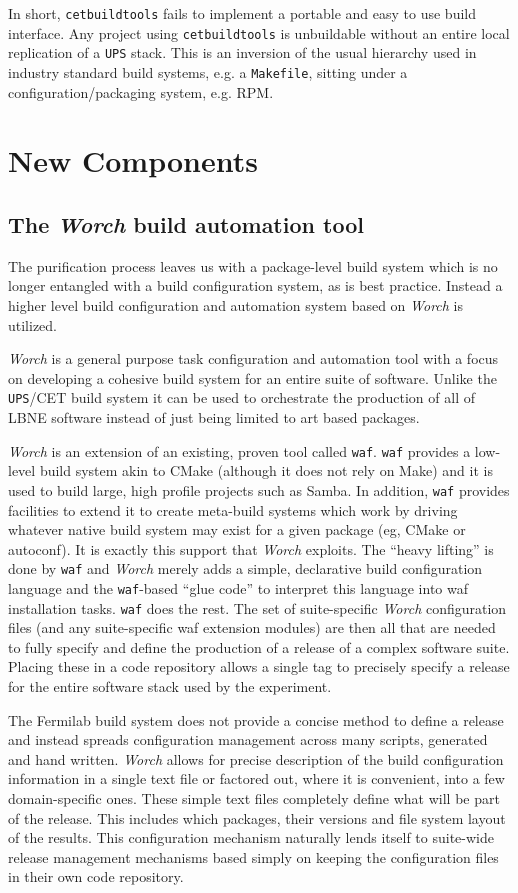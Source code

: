 \documentclass[usletter]{article}
\newcommand{\code}[1]{\texttt{#1}}
\newcommand{\waf}{\code{waf}\xspace}
\newcommand{\worch}{\textit{Worch}\xspace}
\newcommand{\ups}{\code{UPS}\xspace}
\newcommand{\cetbuildtools}{\code{cetbuildtools}\xspace}
\newcommand{\art}{art\xspace}
\begin{document}
In short, \cetbuildtools fails to implement a portable and easy to use
build interface.  Any project using \cetbuildtools is
unbuildable without an entire local replication of a \ups stack. This is
an inversion of the usual hierarchy used in industry standard build systems,
e.g. a \texttt{Makefile}, sitting under a configuration/packaging system, e.g. RPM.

\section{New Components}
\subsection{The \worch build automation tool}

The purification process leaves us with a package-level build system
which is no longer entangled with a build configuration system, as is
best practice.  Instead a higher level build configuration and
automation system based on \worch\cite{worchgh} is utilized.


\worch is a general purpose task configuration and automation tool
with a focus on developing a cohesive build system for an entire suite
of software.  Unlike the \ups/CET build system it can be used to
orchestrate the production of all of LBNE software instead of just
being limited to \art based packages.

\worch is an extension of an existing, proven tool called
\waf\cite{waf}.  \waf provides a low-level build system akin to CMake
(although it does not rely on Make) and it is used to build large,
high profile projects such as Samba.  In addition, \waf provides
facilities to extend it to create meta-build systems which work by
driving whatever native build system may exist for a given package
(eg, CMake or autoconf).  It is exactly this support that \worch
exploits.  The ``heavy lifting'' is done by \waf and \worch merely
adds a simple, declarative build configuration language and the
\waf-based ``glue code'' to interpret this language into waf
installation tasks.  \waf does the rest.  The set of suite-specific
\worch configuration files (and any suite-specific waf extension
modules) are then all that are needed to fully specify and define the
production of a release of a complex software suite.  Placing these in
a code repository allows a single tag to precisely specify a release
for the entire software stack used by the experiment.

The Fermilab build system does not provide a concise method to define
a release and instead spreads configuration management across many
scripts, generated and hand written.  \worch allows for precise
description of the build configuration information in a single text
file or factored out, where it is convenient, into a few
domain-specific ones.  These simple text files completely define what
will be part of the release.  This includes which packages, their
versions and file system layout of the results.  This configuration
mechanism naturally lends itself to suite-wide release management
mechanisms based simply on keeping the configuration files in their
own code repository.
\end{document}
